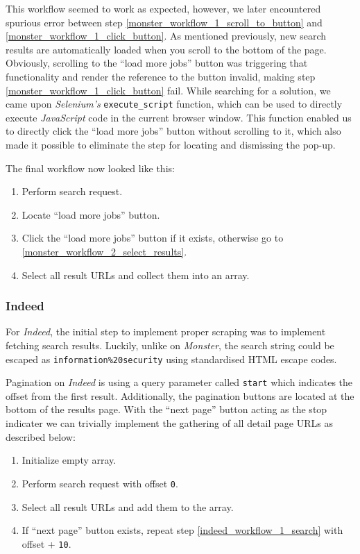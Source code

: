 \documentclass[runningheads]{llncs}
\begin{document}
This workflow seemed to work as expected, however, we later encountered spurious error between step \ref{monster_workflow_1_scroll_to_button} and \ref{monster_workflow_1_click_button}. As mentioned previously, new search results are automatically loaded when you scroll to the bottom of the page. Obviously, scrolling to the “load more jobs” button was triggering that functionality and render the reference to the button invalid, making step \ref{monster_workflow_1_click_button} fail. While searching for a solution, we came upon \textit{Selenium's} \texttt{execute\_script} function, which can be used to directly execute \textit{JavaScript} code in the current browser window. This function enabled us to directly click the “load more jobs” button without scrolling to it, which also made it possible to eliminate the step for locating and dismissing the pop-up.

The final workflow now looked like this:

\begin{enumerate}
  \item Perform search request.
  \item Locate “load more jobs” button.
  \item Click the “load more jobs” button if it exists, otherwise go to \ref{monster_workflow_2_select_results}.
  \item \label{monster_workflow_2_select_results}
    Select all result URLs and collect them into an array.
\end{enumerate}

\subsubsection{Indeed}
\label{subsub:indeed}

For \textit{Indeed}, the initial step to implement proper scraping was to implement fetching search results. Luckily, unlike on \textit{Monster}, the search string could be escaped as \texttt{information\%20security} using standardised HTML escape codes.

Pagination on \textit{Indeed} is using a query parameter called \texttt{start} which indicates the offset from the first result. Additionally, the pagination buttons are located at the bottom of the results page. With the “next page” button acting as the stop indicater we can trivially implement the gathering of all detail page URLs as described below:

\begin{enumerate}
  \item Initialize empty array.
  \item \label{indeed_workflow_1_search}
    Perform search request with offset \texttt{0}.
  \item Select all result URLs and add them to the array.
  \item If “next page” button exists, repeat step \ref{indeed_workflow_1_search} with offset + \texttt{10}.
\end{enumerate}
\end{document}
